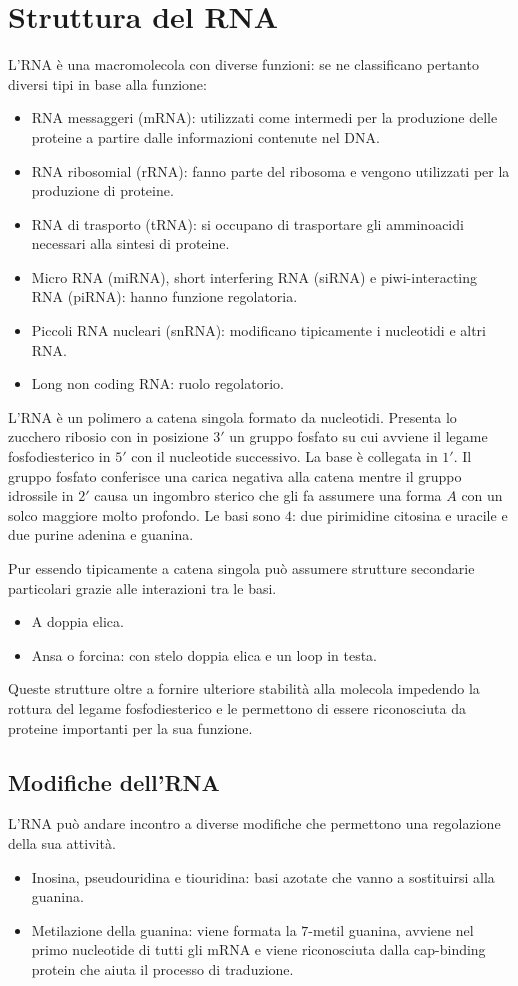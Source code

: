 \section{Struttura del RNA}
L'RNA \`e una macromolecola con diverse funzioni: se ne classificano pertanto diversi tipi in base alla funzione:
\begin{itemize}
	\item RNA messaggeri (mRNA): utilizzati come intermedi per la produzione delle proteine a partire dalle informazioni contenute nel DNA.
	\item RNA ribosomial (rRNA): fanno parte del ribosoma e vengono utilizzati per la produzione di proteine.
	\item RNA di trasporto (tRNA): si occupano di trasportare gli amminoacidi necessari alla sintesi di proteine.
	\item Micro RNA (miRNA), short interfering RNA (siRNA) e piwi-interacting RNA (piRNA): hanno funzione regolatoria.
	\item Piccoli RNA nucleari (snRNA): modificano tipicamente i nucleotidi e altri RNA.
	\item Long non coding RNA: ruolo regolatorio. 

\end{itemize}
L'RNA \`e un polimero a catena singola formato da nucleotidi. 
Presenta lo zucchero ribosio con in posizione $3'$ un gruppo fosfato su cui avviene il legame fosfodiesterico in $5'$ con il
nucleotide successivo. 
La base \`e collegata in $1'$. 
Il gruppo fosfato conferisce una carica negativa alla catena mentre il gruppo idrossile in $2'$ causa un ingombro sterico 
che gli fa assumere una forma $A$ con un solco maggiore molto profondo. 
Le basi sono $4$: due pirimidine citosina e uracile e due purine adenina e guanina. 

Pur essendo tipicamente a catena singola pu\`o assumere strutture secondarie particolari grazie alle interazioni tra le basi. 

\begin{itemize}
	\item A doppia elica.
	\item Ansa o forcina: con stelo doppia elica e un loop in testa.
\end{itemize}
Queste strutture oltre a fornire ulteriore stabilit\`a alla molecola impedendo la rottura del legame fosfodiesterico e le permettono di essere riconosciuta da proteine importanti per la 
sua funzione. 

\subsection{Modifiche dell'RNA}
L'RNA pu\`o andare incontro a diverse modifiche che permettono una regolazione della sua attivit\`a.
\begin{itemize}
	\item Inosina, pseudouridina e tiouridina: basi azotate che vanno a sostituirsi alla guanina.
	\item Metilazione della guanina: viene formata la $7$-metil guanina, avviene nel primo nucleotide di tutti gli mRNA e viene riconosciuta dalla cap-binding protein che aiuta il processo di traduzione.
\end{itemize}
